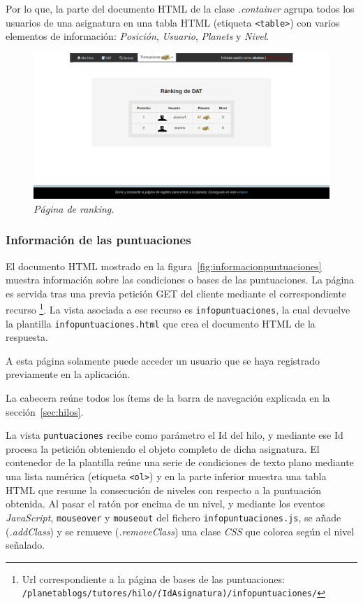 \documentclass[a4paper, 12pt]{book}
\begin{document}
Por lo que, la parte del documento HTML de la clase \textit{.container} agrupa todos los usuarios de una asignatura en una tabla HTML (etiqueta 
\texttt{<table>}) con varios elementos de informaci\'on: \textit{Posici\'on}, \textit{Usuario}, \textit{Planets} y \textit{Nivel}.

\begin{figure}
  \centering
  \includegraphics[width=17cm, keepaspectratio]{imagenes/HiloAlumnoRanking}
  \caption{\textit{P\'agina de ranking.}}
  \label{fig:ranking}
\end{figure}


\subsubsection{Informaci\'on de las puntuaciones} 
\label{sec:informacionpuntuaciones}
El documento HTML mostrado en la figura~\ref{fig:informacionpuntuaciones} muestra informaci\'on sobre las condiciones o bases de las puntuaciones. 
La p\'agina es servida tras una previa petici\'on GET del cliente mediante el correspondiente recurso \footnote{Url correspondiente a la p\'agina de 
bases de las puntuaciones:\\ \texttt{/planetablogs/tutores/hilo/\textit(IdAsignatura)/infopuntuaciones/}}. La vista asociada a ese recurso es 
\texttt{infopuntuaciones}, la cual devuelve la plantilla \texttt{infopuntuaciones.html} que crea el documento HTML de la respuesta.

A esta p\'agina solamente puede acceder un usuario que se haya registrado previamente en la aplicaci\'on.

La cabecera re\'une todos los \'items de la barra de navegaci\'on explicada en la secci\'on~\ref{sec:hilos}.

La vista \texttt{puntuaciones} recibe como par\'ametro el Id del hilo, y mediante ese Id procesa la petici\'on obteniendo el objeto completo de dicha 
asignatura. El contenedor de la plantilla re\'une una serie de condiciones de texto plano mediante una lista num\'erica (etiqueta \texttt{<ol>}) y 
en la parte inferior muestra una tabla HTML que resume la consecuci\'on de niveles con respecto a la puntuaci\'on obtenida. Al pasar el rat\'on por encima 
de un nivel, y mediante los eventos \textit{JavaScript}, \texttt{mouseover} y \texttt{mouseout} del fichero \texttt{infopuntuaciones.js}, se a\~nade 
(\textit{.addClass}) y se remueve (\textit{.removeClass}) una clase \textit{CSS} que colorea seg\'un el nivel se\~nalado.
\end{document}
